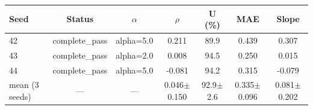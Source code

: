 \begin{tabular}{l c c c c c c}
\toprule
Seed & Status & $\alpha$ & $\rho$ & U (\%) & MAE & Slope \\
\midrule
42 & complete\_pass & alpha=5.0 & 0.211 & 89.9 & 0.439 & 0.307 \\
43 & complete\_pass & alpha=2.0 & 0.008 & 94.5 & 0.250 & 0.015 \\
44 & complete\_pass & alpha=5.0 & -0.081 & 94.2 & 0.315 & -0.079 \\
\midrule
mean (3 seeds) & --- & --- & 0.046$\pm$0.150 & 92.9$\pm$2.6 & 0.335$\pm$0.096 & 0.081$\pm$0.202 \\
\bottomrule
\end{tabular}
